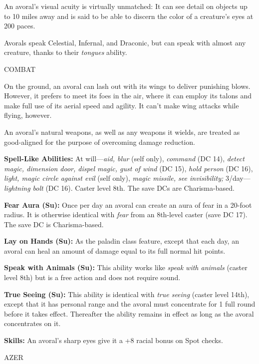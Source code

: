 \documentclass{article}
\begin{document}
An avoral's visual acuity is virtually unmatched: It can see detail on objects 
up to 10 miles away and is said to be able to discern the color of a creature's 
eyes at 200 paces.

Avorals speak Celestial, Infernal, and Draconic, but can speak with almost any 
creature, thanks to their \textit{tongues }ability.

COMBAT

On the ground, an avoral can lash out with its wings to deliver punishing blows. 
However, it prefers to meet its foes in the air, where it can employ its talons 
and make full use of its aerial speed and agility. It can't make wing attacks while 
flying, however.

An avoral's natural weapons, as well as any weapons it wields, are treated as good-aligned 
for the purpose of overcoming damage reduction.

\textbf{Spell-Like Abilities:} At will---\textit{aid, blur }(self only), \textit{command 
}(DC 14), \textit{detect magic, dimension door, dispel magic, gust of wind }(DC 
15), \textit{hold person }(DC 16), \textit{light, magic circle against evil }(self 
only), \textit{magic missile, see invisibility; }3/day---\textit{lightning bolt 
}(DC 16). Caster level 8th. The save DCs are Charisma-based.

\textbf{Fear Aura (Su):} Once per day an avoral can create an aura of fear in a 
20-foot radius. It is otherwise identical with \textit{fear }from an 8th-level 
caster (save DC 17). The save DC is Charisma-based.

\textbf{Lay on Hands (Su):} As the paladin class feature, except that each day, 
an avoral can heal an amount of damage equal to its full normal hit points.

\textbf{Speak with Animals (Su):} This ability works like \textit{speak with animals 
}(caster level 8th) but is a free action and does not require sound.

\textbf{True Seeing (Su):} This ability is identical with \textit{true seeing }(caster 
level 14th), except that it has personal range and the avoral must concentrate 
for 1 full round before it takes effect. Thereafter the ability remains in effect 
as long as the avoral concentrates on it.  

\textbf{Skills:} An avoral's sharp eyes give it a +8 racial bonus on Spot checks.

\vspace{12pt}
{\LARGE{}AZER}
\end{document}
